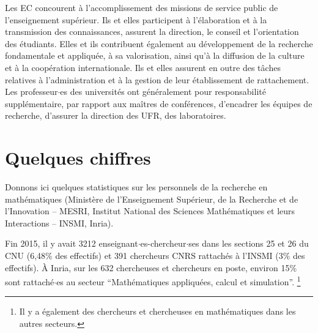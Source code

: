 {}

\medskip 

Les EC concourent \`a l'accomplissement des missions de service
public de l'enseignement sup\'erieur. Ils et elles participent \`a
l'\'elaboration et \`a la transmission des connaissances, assurent
la direction, le conseil et l'orientation des \'etudiants. Elles et ils
contribuent \'egalement au d\'eveloppement de la recherche
fondamentale et appliqu\'ee, \`a sa valorisation, ainsi qu'\`a la
diffusion de la culture et \`a la coop\'eration internationale. Ils et elles
assurent en outre des t\^aches relatives \`a l'administration et \`a
la gestion de leur \'etablissement de rattachement. Les professeur$\cdot$es
des universit\'es ont g\'en\'eralement pour responsabilit\'e suppl\'ementaire, par
rapport aux ma\^itres de conf\'erences, d'encadrer les \'equipes de
recherche, d'assurer la direction des UFR, des laboratoires.


\section{Quelques chiffres}

{\enlargethispage{.5cm}
Donnons ici quelques statistiques sur les personnels de la recherche en math\'ematiques 
(Minist{\`e}re de l'Enseignement Sup{\'e}rieur, de la Recherche et de l'Innovation -- MESRI, 
Institut National des Sciences Math\'ematiques et leurs Interactions -- INSMI, Inria).
}

Fin 2015, il y avait 3212 enseignant$\cdot$es-chercheur$\cdot$ses dans les sections 25 et 26 du CNU (6,48\% des effectifs) et
391 chercheurs CNRS rattach\'es \`a l'INSMI (3\% des effectifs).
\`A Inria, sur les 632 chercheuses et chercheurs en poste, environ 15\% sont rattach\'e$\cdot$es au secteur ``Math\'ematiques appliqu\'ees, calcul et simulation''.%
\footnote{Il y a \'egalement des chercheurs et chercheuses en math\'ematiques dans les autres secteurs.}

